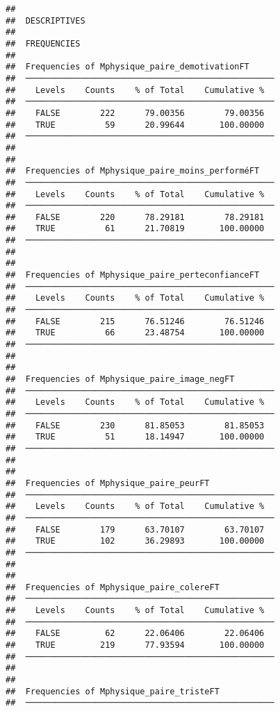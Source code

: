 \documentclass[
]{article}
\begin{document}
\begin{verbatim}
## 
##  DESCRIPTIVES
## 
##  FREQUENCIES
## 
##  Frequencies of Mphysique_paire_demotivationFT      
##  ────────────────────────────────────────────────── 
##    Levels    Counts    % of Total    Cumulative %   
##  ────────────────────────────────────────────────── 
##    FALSE        222      79.00356        79.00356   
##    TRUE          59      20.99644       100.00000   
##  ────────────────────────────────────────────────── 
## 
## 
##  Frequencies of Mphysique_paire_moins_performéFT    
##  ────────────────────────────────────────────────── 
##    Levels    Counts    % of Total    Cumulative %   
##  ────────────────────────────────────────────────── 
##    FALSE        220      78.29181        78.29181   
##    TRUE          61      21.70819       100.00000   
##  ────────────────────────────────────────────────── 
## 
## 
##  Frequencies of Mphysique_paire_perteconfianceFT    
##  ────────────────────────────────────────────────── 
##    Levels    Counts    % of Total    Cumulative %   
##  ────────────────────────────────────────────────── 
##    FALSE        215      76.51246        76.51246   
##    TRUE          66      23.48754       100.00000   
##  ────────────────────────────────────────────────── 
## 
## 
##  Frequencies of Mphysique_paire_image_negFT         
##  ────────────────────────────────────────────────── 
##    Levels    Counts    % of Total    Cumulative %   
##  ────────────────────────────────────────────────── 
##    FALSE        230      81.85053        81.85053   
##    TRUE          51      18.14947       100.00000   
##  ────────────────────────────────────────────────── 
## 
## 
##  Frequencies of Mphysique_paire_peurFT              
##  ────────────────────────────────────────────────── 
##    Levels    Counts    % of Total    Cumulative %   
##  ────────────────────────────────────────────────── 
##    FALSE        179      63.70107        63.70107   
##    TRUE         102      36.29893       100.00000   
##  ────────────────────────────────────────────────── 
## 
## 
##  Frequencies of Mphysique_paire_colereFT            
##  ────────────────────────────────────────────────── 
##    Levels    Counts    % of Total    Cumulative %   
##  ────────────────────────────────────────────────── 
##    FALSE         62      22.06406        22.06406   
##    TRUE         219      77.93594       100.00000   
##  ────────────────────────────────────────────────── 
## 
## 
##  Frequencies of Mphysique_paire_tristeFT            
##  ────────────────────────────────────────────────── 

\end{verbatim}
\end{document}
